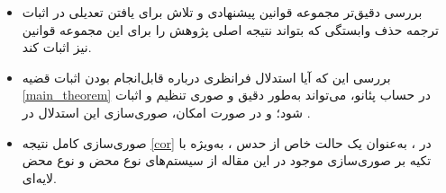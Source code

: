 \documentclass[11pt,twocolumn,a4paper,twoside]{article}
\theoremstyle{definition}
\theoremstyle{theorem}
\theoremstyle{definition}
\theoremstyle{definition}
\theoremstyle{definition}
\theoremstyle{definition}
\theoremstyle{definition}
\begin{document}
\begin{itemize}[noitemsep, topsep=0pt]
  \item[-] بررسی دقیق‌تر مجموعه قوانین پیشنهادی 
    و تلاش برای یافتن تعدیلی در اثبات ترجمه حذف‌ وابستگی که
    بتواند نتیجه اصلی پژوهش را برای این مجموعه قوانین نیز اثبات کند.
  \item[-] بررسی این که آیا استدلال فرانظری  درباره قابل‌انجام
    بودن اثبات قضیه \ref{main_theorem} در حساب پئانو، می‌تواند به‌طور دقیق و صوری تنظیم
    و اثبات شود؛ و در صورت امکان، صوری‌سازی این استدلال در .
  \item[-] صوری‌سازی کامل نتیجه \ref{cor}
    در ، به‌عنوان یک حالت خاص از حدس
    ، به‌ویژه با تکیه بر صوری‌سازی موجود در این مقاله از سیستم‌های نوع محض و نوع محض لایه‌ای.
\end{itemize}




\begin{latin}

 \renewcommand{\refname}{\rl{{$\overline{\text{
مراجع
}}$}
 \hfill}}
 {\linespread{1} \small %
 \nocite{*}

}
\end{latin}
\clearpage
\end{document}
